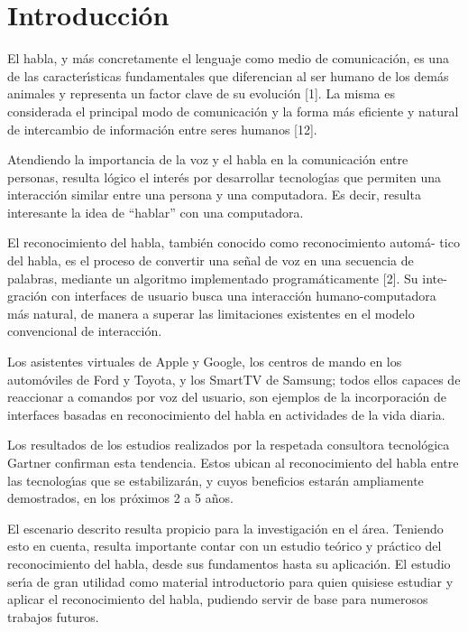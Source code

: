 \chapter{Introducci\'on}
\label{sec:intro}

El habla, y m\'as concretamente el lenguaje como medio de comunicaci\'on, es una
de las caracter{\'\i}sticas fundamentales que diferencian al ser humano de los dem\'as
animales y representa un factor clave de su evoluci\'on [1]. La misma es considerada
el principal modo de comunicaci\'on y la forma m\'as eficiente y natural de intercambio 
de informaci\'on entre seres humanos [12].

Atendiendo la importancia de la voz y el habla en la comunicaci\'on entre personas,
resulta l\'ogico el inter\'es por desarrollar tecnolog{\'\i}as que permiten una interacci\'on
similar entre una persona y una computadora. Es decir, resulta interesante la idea 
de ``hablar'' con una computadora.

El reconocimiento del habla, tambi\'en conocido como reconocimiento autom\'a-
tico del habla, es el proceso de convertir una se\~nal de voz en una secuencia de
palabras, mediante un algoritmo implementado program\'aticamente [2]. Su inte-
graci\'on con interfaces de usuario busca una interacci\'on humano-computadora m\'as
natural, de manera a superar las limitaciones existentes en el modelo convencional
de interacci\'on.

Los asistentes virtuales de Apple y Google, los centros de mando en los autom\'oviles
de Ford y Toyota, y los SmartTV de Samsung; todos ellos capaces de reaccionar a
comandos por voz del usuario, son ejemplos de la incorporaci\'on de interfaces basadas
en reconocimiento del habla en actividades de la vida diaria.

Los resultados de los estudios realizados por la respetada consultora tecnol\'ogica
Gartner confirman esta tendencia. Estos ubican al reconocimiento del habla entre
las tecnolog{\'\i}as que se estabilizar\'an, y cuyos beneficios estar\'an ampliamente
demostrados, en los pr\'oximos 2 a 5 a\~nos.

El escenario descrito resulta propicio para la investigaci\'on en el \'area.
Teniendo esto en cuenta, resulta importante contar con un estudio te\'orico
y pr\'actico del reconocimiento del habla, desde sus fundamentos hasta su
aplicaci\'on. El estudio ser{\'\i}a de gran utilidad como material introductorio
para quien quisiese estudiar y aplicar el reconocimiento del habla, pudiendo
servir de base para numerosos trabajos futuros.

